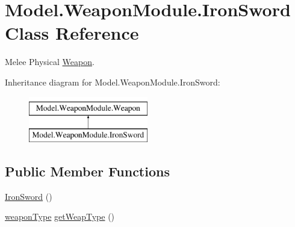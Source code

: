\hypertarget{class_model_1_1_weapon_module_1_1_iron_sword}{}\section{Model.\+Weapon\+Module.\+Iron\+Sword Class Reference}
\label{class_model_1_1_weapon_module_1_1_iron_sword}


Melee Physical \hyperlink{interface_model_1_1_weapon_module_1_1_weapon}{Weapon}.  


Inheritance diagram for Model.\+Weapon\+Module.\+Iron\+Sword\+:\begin{figure}[H]
\begin{center}
\leavevmode
\includegraphics[height=2.000000cm]{class_model_1_1_weapon_module_1_1_iron_sword}
\end{center}
\end{figure}
\subsection*{Public Member Functions}
\begin{DoxyCompactItemize}
\item 
\hyperlink{class_model_1_1_weapon_module_1_1_iron_sword_ab4d225fec1f0784f801740c1a4b65a25}{Iron\+Sword} ()
\item 
\hyperlink{namespace_model_1_1_weapon_module_a3390c266f89e3399c2bc7fa31f13cbec}{weapon\+Type} \hyperlink{class_model_1_1_weapon_module_1_1_iron_sword_a886800dd0c3fbebebbf410dab9f91454}{get\+Weap\+Type} ()
\end{DoxyCompactItemize}
